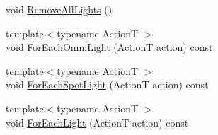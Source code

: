 \begin{DoxyCompactItemize}
\item 
void \hyperlink{classmage_1_1_scene_acde7e343459ea1444f2b0f7bbb3e1882}{Remove\+All\+Lights} ()
\item 
{\footnotesize template$<$typename ActionT $>$ }\\void \hyperlink{classmage_1_1_scene_acd71cef84ec39e63852d5918c7b17863}{For\+Each\+Omni\+Light} (ActionT action) const
\item 
{\footnotesize template$<$typename ActionT $>$ }\\void \hyperlink{classmage_1_1_scene_a51bb697a9d96891bb7502317efff7ec1}{For\+Each\+Spot\+Light} (ActionT action) const
\item 
{\footnotesize template$<$typename ActionT $>$ }\\void \hyperlink{classmage_1_1_scene_a131c27235c6f172a316c56fea7f2e80c}{For\+Each\+Light} (ActionT action) const
\end{DoxyCompactItemize}
